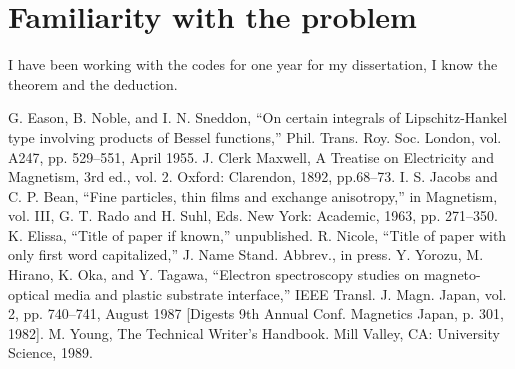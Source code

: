 \documentclass[conference]{IEEEtran}
\begin{document}
%
%
\section{Familiarity with the problem}
I have been working with the codes for one year for my dissertation, I know the theorem and the deduction.

%
%
\begin{thebibliography}{00}
     G. Eason, B. Noble, and I. N. Sneddon, ``On certain integrals of Lipschitz-Hankel type involving products of Bessel functions,'' Phil. Trans. Roy. Soc. London, vol. A247, pp. 529--551, April 1955.
     J. Clerk Maxwell, A Treatise on Electricity and Magnetism, 3rd ed., vol. 2. Oxford: Clarendon, 1892, pp.68--73.
     I. S. Jacobs and C. P. Bean, ``Fine particles, thin films and exchange anisotropy,'' in Magnetism, vol. III, G. T. Rado and H. Suhl, Eds. New York: Academic, 1963, pp. 271--350.
     K. Elissa, ``Title of paper if known,'' unpublished.
     R. Nicole, ``Title of paper with only first word capitalized,'' J. Name Stand. Abbrev., in press.
     Y. Yorozu, M. Hirano, K. Oka, and Y. Tagawa, ``Electron spectroscopy studies on magneto-optical media and plastic substrate interface,'' IEEE Transl. J. Magn. Japan, vol. 2, pp. 740--741, August 1987 [Digests 9th Annual Conf. Magnetics Japan, p. 301, 1982].
     M. Young, The Technical Writer's Handbook. Mill Valley, CA: University Science, 1989.
\end{thebibliography}
\end{document}
